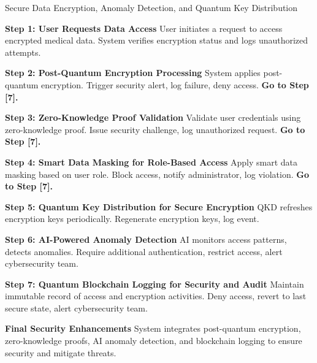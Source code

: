 \documentclass[pdflatex,sn-mathphys-num]{sn-jnl}
\theoremstyle{thmstyleone}%
\theoremstyle{thmstyletwo}%
\theoremstyle{thmstylethree}%
\begin{document}

\begin{algorithm}[h!]
\caption{Secure Data Encryption, Anomaly Detection, and Quantum Key Distribution}
\begin{algorithmic}[1]

\STATE \textbf{Step 1: User Requests Data Access}
\STATE User initiates a request to access encrypted medical data.
\STATE System verifies encryption status and logs unauthorized attempts.

\STATE \textbf{Step 2: Post-Quantum Encryption Processing}
\STATE System applies post-quantum encryption.
    \STATE Trigger security alert, log failure, deny access. \textbf{Go to Step [7].}
\ENDIF

\STATE \textbf{Step 3: Zero-Knowledge Proof Validation}
\STATE Validate user credentials using zero-knowledge proof.
    \STATE Issue security challenge, log unauthorized request. \textbf{Go to Step [7].}
\ENDIF

\STATE \textbf{Step 4: Smart Data Masking for Role-Based Access}
\STATE Apply smart data masking based on user role.
    \STATE Block access, notify administrator, log violation. \textbf{Go to Step [7].}
\ENDIF

\STATE \textbf{Step 5: Quantum Key Distribution for Secure Encryption}
\STATE QKD refreshes encryption keys periodically.
    \STATE Regenerate encryption keys, log event.
\ENDIF

\STATE \textbf{Step 6: AI-Powered Anomaly Detection}
\STATE AI monitors access patterns, detects anomalies.
    \STATE Require additional authentication, restrict access, alert cybersecurity team.
\ENDIF


\STATE \textbf{Step 7: Quantum Blockchain Logging for Security and Audit}
\STATE Maintain immutable record of access and encryption activities.
    \STATE Deny access, revert to last secure state, alert cybersecurity team.
\ENDIF

\STATE \textbf{Final Security Enhancements}
\STATE System integrates post-quantum encryption, zero-knowledge proofs, AI anomaly detection, and blockchain logging to ensure security and mitigate threats.

\end{algorithmic}
\end{algorithm}
\end{document}
